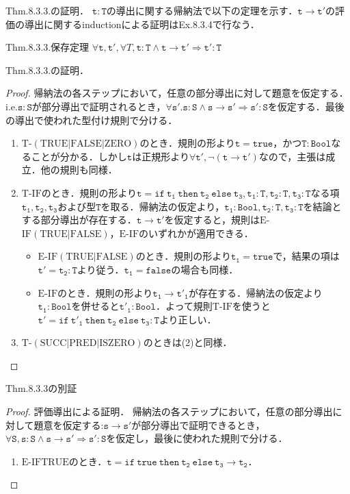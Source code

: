 \documentclass[9pt]{beamer}
\begin{document}
\begin{frame}{Thm.8.3.3.の証明．}
$\mathtt{t:T}$の導出に関する帰納法で以下の定理を示す．$\mathtt{t\rightarrow t'}$の評価の導出に関するinductionによる証明はEx.8.3.4で行なう．
\begin{dblock}{Thm.8.3.3.保存定理}
	$\forall \mathtt{t,t'},\forall{T}, \mathtt{t:T\land t\rightarrow t'}\Rightarrow \mathtt{t':T}$
\end{dblock}
\end{frame}\begin{frame}{Thm.8.3.3.の証明．}
\begin{proof}
帰納法の各ステップにおいて，任意の部分導出に対して題意を仮定する．i.e.$\mathtt{s:S}$が部分導出で証明されるとき，$\forall \mathtt{s'. s:S\land s\rightarrow s'\Rightarrow s':S}$を仮定する．最後の導出で使われた型付け規則で分ける．\begin{enumerate}
	\item $\mathrm{T}$-$\mathrm{(TRUE|FALSE|ZERO)}$のとき．規則の形より$\mathtt{t = true}$，かつ$\mathtt{T:Bool}$なることが分かる．しかし$\mathtt{t}$は正規形より$\mathtt{\forall t', \neg(t\rightarrow t')}$なので，主張は成立．他の規則も同様．
	\item $\mathrm{T}$-$\mathrm{IF}$のとき．規則の形より$\mathtt{t = if \ t_{1}\ then\ t_{2}\ else\ t_{3}, t_{1}:T, t_{2}:T, t_{3}:T}$なる項$\mathtt{t_{1}, t_{2}, t_{3}}$および型$\mathtt{T}$を取る．帰納法の仮定より，$\mathtt{t_{1}:Bool, t_{2}:T, t_{3}:T}$を結論とする部分導出が存在する．$\mathtt{t\rightarrow t'}$を仮定すると，規則は$\mathrm{E}$-$\mathrm{IF(TRUE|FALSE)}$，$\mathrm{E}$-$\mathrm{IF}$のいずれかが適用できる．\begin{itemize}
	\item $\mathrm{E}$-$\mathrm{IF(TRUE|FALSE)}$のとき．規則の形より$\mathtt{t_{1} = true}$で，結果の項は$\mathtt{t' = t_{2}:T}$より従う．$\mathtt{t_{1}= false}$の場合も同様．
	\item $\mathrm{E}$-$\mathrm{IF}$のとき．規則の形より$\mathtt{t_{1}\rightarrow t'_{1}}$が存在する．帰納法の仮定より$\mathtt{t_{1}:Bool}$を併せると$\mathtt{t'_{1}:Bool}$．よって規則$\mathrm{T}$-$\mathrm{IF}$を使うと$\mathtt{t' = if\ t'_{1}\ then\ t_{2}\ else\ t_{3}:T}$より正しい．
	\end{itemize}
	\item $\mathrm{T}$-$\mathrm{(SUCC|PRED|ISZERO)}$のときは(2)と同様．
\end{enumerate}
\end{proof}
\end{frame}
\begin{frame}{Thm.8.3.3の別証}
\begin{proof}{評価導出による証明．}
帰納法の各ステップにおいて，任意の部分導出に対して題意を仮定する:$\mathtt{s \rightarrow s'}$が部分導出で証明できるとき，$\mathtt{\forall S, s: S\land s \rightarrow s' \Rightarrow s' :S}$を仮定し，最後に使われた規則で分ける．
\begin{enumerate}
	\item $\mathrm{E}$-$\mathrm{IFTRUE}$のとき．$\mathtt{t = if\ true\ then\ t_{2}\ else\ t_{3}\rightarrow t_{2}}$．
\end{enumerate}
\end{proof}
\end{frame}
\end{document}
